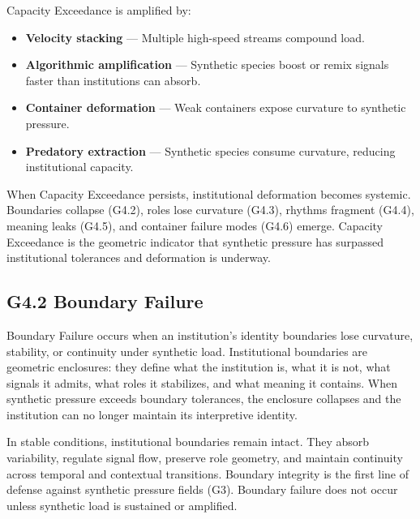 \medskip

\noindent Capacity Exceedance is amplified by:

\begin{itemize}[leftmargin=1.2cm]
    \item \textbf{Velocity stacking} — Multiple high-speed streams compound load.

    \item \textbf{Algorithmic amplification} — Synthetic species boost or remix
    signals faster than institutions can absorb.

    \item \textbf{Container deformation} — Weak containers expose curvature to
    synthetic pressure.

    \item \textbf{Predatory extraction} — Synthetic species consume curvature,
    reducing institutional capacity.
\end{itemize}

\medskip

\noindent When Capacity Exceedance persists, institutional deformation becomes
systemic. Boundaries collapse (G4.2), roles lose curvature (G4.3), rhythms
fragment (G4.4), meaning leaks (G4.5), and container failure modes (G4.6)
emerge. Capacity Exceedance is the geometric indicator that synthetic pressure
has surpassed institutional tolerances and deformation is underway.

\subsection*{G4.2 Boundary Failure}

\noindent Boundary Failure occurs when an institution’s identity boundaries lose
curvature, stability, or continuity under synthetic load. Institutional
boundaries are geometric enclosures: they define what the institution is, what
it is not, what signals it admits, what roles it stabilizes, and what meaning it
contains. When synthetic pressure exceeds boundary tolerances, the enclosure
collapses and the institution can no longer maintain its interpretive identity.

\medskip

\noindent In stable conditions, institutional boundaries remain intact. They
absorb variability, regulate signal flow, preserve role geometry, and maintain
continuity across temporal and contextual transitions. Boundary integrity is the
first line of defense against synthetic pressure fields (G3). Boundary failure
does not occur unless synthetic load is sustained or amplified.

